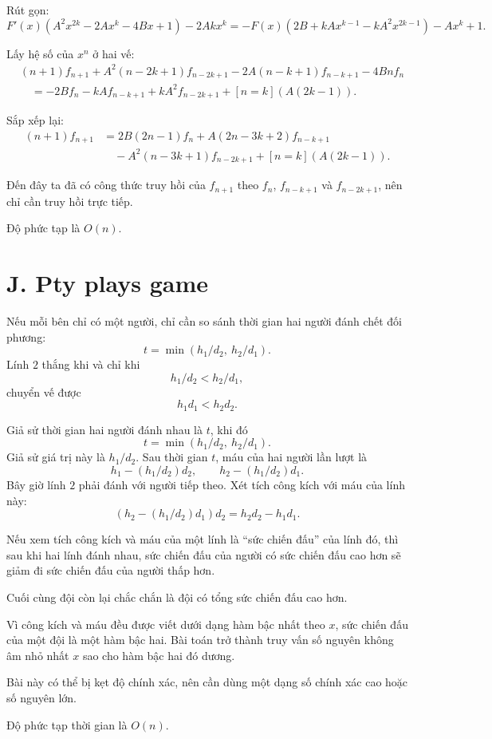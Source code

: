 \documentclass[11pt]{article}
\begin{document}
Rút gọn:
\[
  F'(x)(A^2x^{2k}-2Ax^k-4Bx+1)-2Akx^k
  =
  -F(x)(2B+kAx^{k-1}-kA^2x^{2k-1})-Ax^k+1.
\]

Lấy hệ số của $x^n$ ở hai vế:
\[
\begin{aligned}
 &(n+1)f_{n+1}
 +A^2(n-2k+1)f_{n-2k+1}
 -2A(n-k+1)f_{n-k+1}
 -4Bnf_n\\
 &\quad =
 -2Bf_n-kAf_{n-k+1}+kA^2f_{n-2k+1}
 +[n=k](A(2k-1)).
\end{aligned}
\]

Sắp xếp lại:
\[
\begin{aligned}
  (n+1)f_{n+1}
  &=2B(2n-1)f_n
    +A(2n-3k+2)f_{n-k+1}\\
  &\quad
    -A^2(n-3k+1)f_{n-2k+1}
    +[n=k](A(2k-1)).
\end{aligned}
\]

Đến đây ta đã có công thức truy hồi của $f_{n+1}$ theo
$f_n$, $f_{n-k+1}$ và $f_{n-2k+1}$, nên chỉ cần truy hồi trực tiếp.

Độ phức tạp là $O(n)$.

\section{J. Pty plays game}

Nếu mỗi bên chỉ có một người, chỉ cần so sánh thời gian hai người đánh chết
đối phương:
\[
  t=\min(h_1/d_2,\ h_2/d_1).
\]
Lính $2$ thắng khi và chỉ khi
\[
  h_1/d_2<h_2/d_1,
\]
chuyển vế được
\[
  h_1d_1<h_2d_2.
\]

Giả sử thời gian hai người đánh nhau là $t$, khi đó
\[
  t=\min(h_1/d_2,\ h_2/d_1).
\]
Giả sử giá trị này là $h_1/d_2$. Sau thời gian $t$, máu của hai người lần
lượt là
\[
  h_1-(h_1/d_2)d_2,\qquad h_2-(h_1/d_2)d_1.
\]
Bây giờ lính $2$ phải đánh với người tiếp theo. Xét tích công kích với máu
của lính này:
\[
  (h_2-(h_1/d_2)d_1)d_2=h_2d_2-h_1d_1.
\]

Nếu xem tích công kích và máu của một lính là ``sức chiến đấu'' của lính đó,
thì sau khi hai lính đánh nhau, sức chiến đấu của người có sức chiến đấu cao
hơn sẽ giảm đi sức chiến đấu của người thấp hơn.

Cuối cùng đội còn lại chắc chắn là đội có tổng sức chiến đấu cao hơn.

Vì công kích và máu đều được viết dưới dạng hàm bậc nhất theo $x$, sức chiến
đấu của một đội là một hàm bậc hai. Bài toán trở thành truy vấn số nguyên
không âm nhỏ nhất $x$ sao cho hàm bậc hai đó dương.

Bài này có thể bị kẹt độ chính xác, nên cần dùng một dạng số chính xác cao
hoặc số nguyên lớn.

Độ phức tạp thời gian là $O(n)$.
\end{document}
